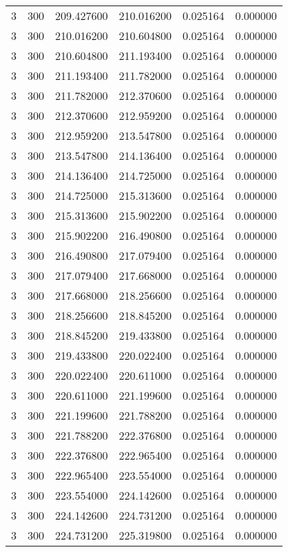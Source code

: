 \begin{longtable}{rrrrrr}
3 & 300 & 209.427600 & 210.016200 & 0.025164 & 0.000000 \\
3 & 300 & 210.016200 & 210.604800 & 0.025164 & 0.000000 \\
3 & 300 & 210.604800 & 211.193400 & 0.025164 & 0.000000 \\
3 & 300 & 211.193400 & 211.782000 & 0.025164 & 0.000000 \\
3 & 300 & 211.782000 & 212.370600 & 0.025164 & 0.000000 \\
3 & 300 & 212.370600 & 212.959200 & 0.025164 & 0.000000 \\
3 & 300 & 212.959200 & 213.547800 & 0.025164 & 0.000000 \\
3 & 300 & 213.547800 & 214.136400 & 0.025164 & 0.000000 \\
3 & 300 & 214.136400 & 214.725000 & 0.025164 & 0.000000 \\
3 & 300 & 214.725000 & 215.313600 & 0.025164 & 0.000000 \\
3 & 300 & 215.313600 & 215.902200 & 0.025164 & 0.000000 \\
3 & 300 & 215.902200 & 216.490800 & 0.025164 & 0.000000 \\
3 & 300 & 216.490800 & 217.079400 & 0.025164 & 0.000000 \\
3 & 300 & 217.079400 & 217.668000 & 0.025164 & 0.000000 \\
3 & 300 & 217.668000 & 218.256600 & 0.025164 & 0.000000 \\
3 & 300 & 218.256600 & 218.845200 & 0.025164 & 0.000000 \\
3 & 300 & 218.845200 & 219.433800 & 0.025164 & 0.000000 \\
3 & 300 & 219.433800 & 220.022400 & 0.025164 & 0.000000 \\
3 & 300 & 220.022400 & 220.611000 & 0.025164 & 0.000000 \\
3 & 300 & 220.611000 & 221.199600 & 0.025164 & 0.000000 \\
3 & 300 & 221.199600 & 221.788200 & 0.025164 & 0.000000 \\
3 & 300 & 221.788200 & 222.376800 & 0.025164 & 0.000000 \\
3 & 300 & 222.376800 & 222.965400 & 0.025164 & 0.000000 \\
3 & 300 & 222.965400 & 223.554000 & 0.025164 & 0.000000 \\
3 & 300 & 223.554000 & 224.142600 & 0.025164 & 0.000000 \\
3 & 300 & 224.142600 & 224.731200 & 0.025164 & 0.000000 \\
3 & 300 & 224.731200 & 225.319800 & 0.025164 & 0.000000 \\

\end{longtable}
